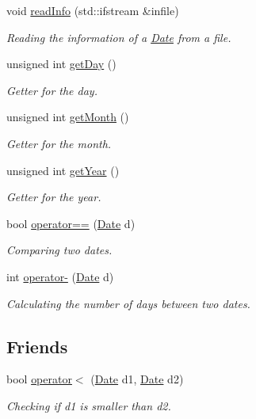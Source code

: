 \begin{DoxyCompactItemize}
void \mbox{\hyperlink{class_date_ad23dffa000ed62018a399c519acb06db}{read\+Info}} (std\+::ifstream \&infile)
\begin{DoxyCompactList}\small\item\em Reading the information of a \mbox{\hyperlink{class_date}{Date}} from a file. \end{DoxyCompactList}\item 
unsigned int \mbox{\hyperlink{class_date_ab39b571a45cbcdfd37b23c28801fa7b0}{get\+Day}} ()
\begin{DoxyCompactList}\small\item\em Getter for the day. \end{DoxyCompactList}\item 
unsigned int \mbox{\hyperlink{class_date_a9efc6db1870de82dbd717f1c3c782f82}{get\+Month}} ()
\begin{DoxyCompactList}\small\item\em Getter for the month. \end{DoxyCompactList}\item 
unsigned int \mbox{\hyperlink{class_date_a90be6a509b91ee9addfeec0e68b965e2}{get\+Year}} ()
\begin{DoxyCompactList}\small\item\em Getter for the year. \end{DoxyCompactList}\item 
bool \mbox{\hyperlink{class_date_a0036e87463cdee6117d27f04933393fb}{operator==}} (\mbox{\hyperlink{class_date}{Date}} d)
\begin{DoxyCompactList}\small\item\em Comparing two dates. \end{DoxyCompactList}\item 
int \mbox{\hyperlink{class_date_a5f459b53c99391cc464c0c55268d133c}{operator-\/}} (\mbox{\hyperlink{class_date}{Date}} d)
\begin{DoxyCompactList}\small\item\em Calculating the number of days between two dates. \end{DoxyCompactList}\end{DoxyCompactItemize}
\subsection*{Friends}
\begin{DoxyCompactItemize}
\item 
bool \mbox{\hyperlink{class_date_ab238dfc73280d2b16266ebd3daf1b896}{operator$<$}} (\mbox{\hyperlink{class_date}{Date}} d1, \mbox{\hyperlink{class_date}{Date}} d2)
\begin{DoxyCompactList}\small\item\em Checking if d1 is smaller than d2. \end{DoxyCompactList}\end{DoxyCompactItemize}


